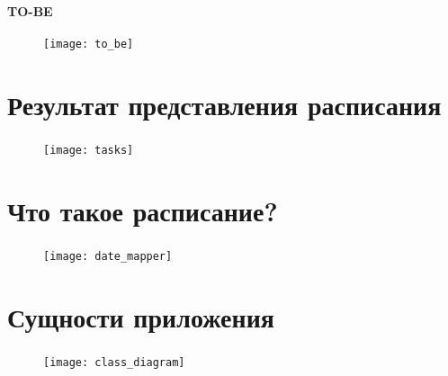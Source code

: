 \begin{frame}
\frametitle{\insertsection}
\framesubtitle{TO-BE}

\begin{figure}
    \center
    \texttt{[image: to\_be]}
\end{figure}
\end{frame}


\section{Результат представления расписания}

\begin{frame}
\frametitle{\insertsection}

\begin{figure}
    \center
    \texttt{[image: tasks]}
\end{figure}
\end{frame}


\section{Что такое расписание?}

\begin{frame}
\frametitle{\insertsection}

\begin{figure}
    \center
    \texttt{[image: date\_mapper]}
\end{figure}
\end{frame}


\section{Сущности приложения}

\begin{frame}
\frametitle{\insertsection}

\begin{figure}
    \center
    \texttt{[image: class\_diagram]}
\end{figure}
\end{frame}

